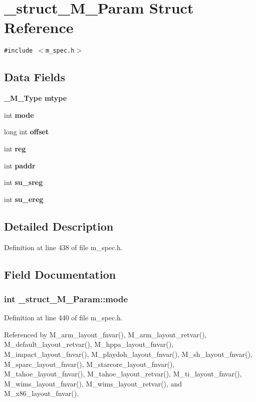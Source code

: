 \section{\_\-struct\_\-M\_\-Param Struct Reference}
\label{struct__struct__M__Param}
{\tt \#include $<$m\_\-spec.h$>$}

\subsection*{Data Fields}
\begin{CompactItemize}
\item 
\bf{\_\-M\_\-Type} \bf{mtype}
\item 
int \bf{mode}
\item 
long int \bf{offset}
\item 
int \bf{reg}
\item 
int \bf{paddr}
\item 
int \bf{su\_\-sreg}
\item 
int \bf{su\_\-ereg}
\end{CompactItemize}


\subsection{Detailed Description}




Definition at line 438 of file m\_\-spec.h.

\subsection{Field Documentation}
\subsubsection{\setlength{\rightskip}{0pt plus 5cm}int \bf{\_\-struct\_\-M\_\-Param::mode}}\label{struct__struct__M__Param_a1e733518ad5ac8989163bd33cb3bcc1}




Definition at line 440 of file m\_\-spec.h.

Referenced by M\_\-arm\_\-layout\_\-fnvar(), M\_\-arm\_\-layout\_\-retvar(), M\_\-default\_\-layout\_\-retvar(), M\_\-hppa\_\-layout\_\-fnvar(), M\_\-impact\_\-layout\_\-fnvar(), M\_\-playdoh\_\-layout\_\-fnvar(), M\_\-sh\_\-layout\_\-fnvar(), M\_\-sparc\_\-layout\_\-fnvar(), M\_\-starcore\_\-layout\_\-fnvar(), M\_\-tahoe\_\-layout\_\-fnvar(), M\_\-tahoe\_\-layout\_\-retvar(), M\_\-ti\_\-layout\_\-fnvar(), M\_\-wims\_\-layout\_\-fnvar(), M\_\-wims\_\-layout\_\-retvar(), and M\_\-x86\_\-layout\_\-fnvar().
